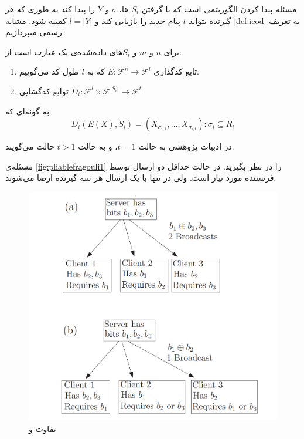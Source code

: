 	 مسئله 
	 \picodt
	 پیدا کردن الگوریتمی است که با گرفتن 
	 $S_i$
	 ها،
	 $\sigma$
	 و
	 $Y$
	 را پیدا کند به طوری که هر گیرنده بتواند
	 $t$
	 پیام جدید را بازیابی کند و 
	 $l = |Y|$
	 کمینه شود. مشابه
	 \autoref{def:icod}
	 به تعریف رسمی
	 \picodt
	 میپردازیم:
\begin{definition}[\picodt]
	\label{def:picodt}
	برای
	$n$
	و
	$m$
	و
	$S_i$های 
 داده‌شده‌ی یک
	\picodt
	عبارت است از:
	\begin{enumerate}
		\item 
		تابع کدگذاری
		$E: \mathcal{F}^n \rightarrow \mathcal{F}^l$
		که به 
		$l$
		طول کد می‌گوییم.
		\item 
		توابع کدگشایی 
		$D_i: \mathcal{F}^l \times \mathcal{F}^{|S_i|} \rightarrow \mathcal{F}^t$
	\end{enumerate}
	به گونه‌ای که
	$$D_i(E(X), S_i) = (X_{\sigma_{i,1}}, \ldots, X_{\sigma_{i,t}}): \sigma_i \subseteq R_i$$
\end{definition}

در ادبیات پژوهشی به حالت
$t = 1$،
\picod
 و به حالت
$t > 1$
حالت
می‌گویند.

\begin{remark}
مسئله‌ی 
\autoref{fig:pliablefragouli1}
را در نظر بگیرید. در حالت 
\icod
 حداقل دو ارسال توسط فرستنده مورد نیاز است. ولی در
 \picod
 تنها با یک ارسال هر سه گیرنده ارضا می‌شوند.
 \begin{figure}[H]
 	\centering
 	\includegraphics[width=0.6\linewidth]{figs/ch3/pliable_fragouli1}
 	\caption[تفاوت
 	\icod
 	و
 	\picod]{تفاوت
 		\icod
 		و
 		\picod
 		\cite{pliablefirstpaper}}
 	\label{fig:pliablefragouli1}
 \end{figure}
\end{remark}

